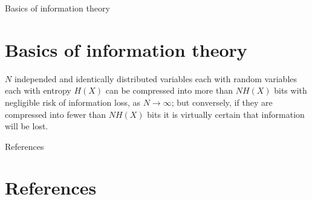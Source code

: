 \documentclass{beamer}
\begin{document}
\begin{frame}{Basics of information theory}
    \section{Basics of information theory}
    \begin{theorem}
    $N$ independed and identically distributed variables each with random variables each with entropy $H(X)$ can be compressed into more than $NH(X)$ bits with negligible risk of information loss, as $N \to \infty$; but conversely, if they are compressed into fewer than $NH(X)$ bits it is virtually certain that information will be lost.
    \end{theorem}
\end{frame}
\begin{frame}[shrink=30]{References}
	\section*{References}
    \printbibliography
\end{frame}
\end{document}
